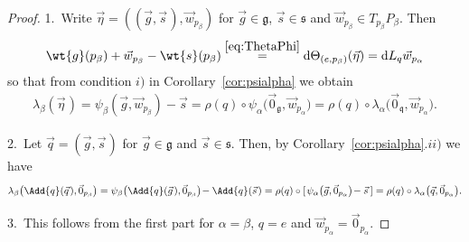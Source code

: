 \begin{proof}
1.~Write $\vec{\eta}=((\vec{g},\vec{s}\hspace{1pt}),\vec{w}_{p_\beta})$ for $\vec{g}\in\mathfrak{g}$, $\vec{s}\in\mathfrak{s}$ and
$\vec{w}_{p_\beta}\in T_{p_\beta}P_\beta$.
Then
\begin{gather*}
\wt{g}(p_\beta)
+\vec{w}_{p_\beta}-\wt{s}(p_\beta)\stackrel{\eqref{eq:ThetaPhi}}{=}\mathrm{d}\Theta_{(e,p_\beta)}(\vec{\eta})=\mathrm{d}
L_q\vec{w}_{p_\alpha}
\end{gather*}
so that from condition $i)$ in Corollary~\ref{cor:psialpha} we obtain
\begin{gather*}
\lambda_\beta(\vec{\eta}\hspace{1pt})=\psi_\beta(\vec{g},\vec{w}_{p_\beta})-\vec{s}
=\rho(q)\circ\psi_\alpha\big(\vec{0}_{\mathfrak{g}},\vec{w}_{p_\alpha}\big)
=\rho(q)\circ\lambda_\alpha\big(\vec{0}_{\mathfrak{q}},
\vec{w}_{p_\alpha}\big).
\end{gather*}

2.~Let $\vec{q}=(\vec{g},\vec{s}\hspace{1pt})$ for $\vec{g}\in\mathfrak{g}$ and $\vec{s}\in \mathfrak{s}$.
Then, by Corollary~\ref{cor:psialpha}.$ii)$ we have
\begin{gather*}
\lambda_\beta\big(\Add{q}(\vec{q}\hspace{1pt}),\vec{0}_{p_\beta}\big)=\psi_\beta\big(\Add{q}(\vec{g}\hspace{1pt}),\vec{0}_{p_\beta}\big)\!-
\Add{q}(\vec{s}\hspace{1pt})
=\rho(q)\circ [\hspace{1pt}\psi_\alpha\big(\vec{g},\vec{0}_{p_\alpha}\big)\!- \vec{s}\hspace{2pt}] =\rho(q) \circ
\lambda_\alpha\big(\vec{q},\vec{0}_{p_\alpha}\big).
\end{gather*}

3.~This follows from the f\/irst part for $\alpha=\beta$, $q=e$ and $\vec{w}_{p_\alpha}=\vec{0}_{p_\alpha}$.


\end{proof}
